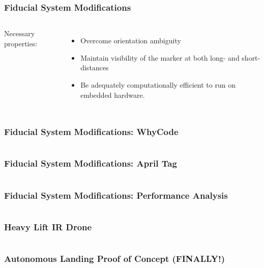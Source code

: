 \documentclass[aspectratio=169]{rubeamer}
\begin{document}
\begin{frame}
  \frametitle{Fiducial System Modifications}
  \begin{columns}
    Necessary properties:
    \begin{itemize}
      \item Overcome orientation ambiguity
      \item Maintain visibility of the marker at both long- and short- distances
      \item Be adequately computationally efficient to run on embedded hardware.
    \end{itemize}
    \centering
  \end{columns}
\end{frame}

\begin{frame}
  \frametitle{Fiducial System Modifications: WhyCode}
  \begin{columns}
    \centering
  \end{columns}
\end{frame}

\begin{frame}
  \frametitle{Fiducial System Modifications: April Tag}
  \begin{columns}
    \centering
  \end{columns}
\end{frame}

\begin{frame}
  \frametitle{Fiducial System Modifications: Performance Analysis}
  \begin{columns}
    \centering
  \end{columns}
\end{frame}

\begin{frame}
  \frametitle{Heavy Lift IR Drone}
  \begin{columns}
    \centering
  \end{columns}
\end{frame}

\begin{frame}
  \frametitle{Autonomous Landing Proof of Concept \textbf{(FINALLY!)}}
  \begin{columns}
    \centering
  \end{columns}
\end{frame}
\end{document}
